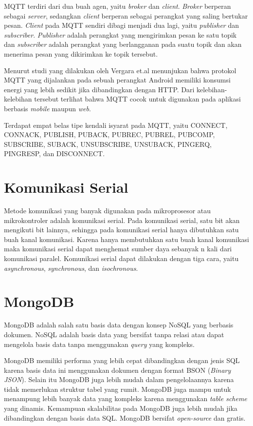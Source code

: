 MQTT terdiri dari dua buah agen, yaitu \textit{broker} dan \textit{client}. \textit{Broker} berperan sebagai \textit{server}, sedangkan \textit{client} berperan sebagai perangkat yang saling bertukar pesan. \textit{Client} pada MQTT sendiri dibagi menjadi dua lagi, yaitu \textit{publisher} dan \textit{subscriber}. \textit{Publisher} adalah perangkat yang mengirimkan pesan ke satu topik dan \textit{subscriber} adalah perangkat yang berlangganan pada suatu topik dan akan menerima pesan yang dikirimkan ke topik tersebut.

Menurut studi yang dilakukan oleh Vergara et.al menunjukan bahwa protokol MQTT yang dijalankan pada sebuah perangkat Android memiliki konsumsi energi yang lebih sedikit jika dibandingkan dengan HTTP. Dari kelebihan-kelebihan tersebut terlihat bahwa MQTT cocok untuk digunakan pada aplikasi berbasis \textit{mobile} maupun \textit{web}.

Terdapat empat belas tipe kendali isyarat pada MQTT, yaitu CONNECT, CONNACK, PUBLISH, PUBACK, PUBREC, PUBREL, PUBCOMP, SUBSCRIBE, SUBACK, UNSUBSCRIBE, UNSUBACK, PINGERQ, PINGRESP, dan DISCONNECT.


\section{Komunikasi Serial}
Metode komunikasi yang banyak digunakan pada mikroprosesor atau mikrokontroler adalah komunikasi serial. Pada komunikasi serial, satu bit akan mengikuti bit lainnya, sehingga pada komunikasi serial hanya dibutuhkan satu buah kanal komunikasi. Karena hanya membutuhkan satu buah kanal komunikasi maka komunikasi serial dapat menghemat sumber daya sebanyak n kali dari komunikasi paralel. Komunikasi serial dapat dilakukan dengan tiga cara, yaitu \textit{asynchronous}, \textit{synchronous}, dan \textit{isochronous}.
	
\section{MongoDB}
MongoDB adalah salah satu basis data dengan konsep NoSQL yang berbasis dokumen. NoSQL adalah basis data yang bersifat tanpa relasi atau dapat mengelola basis data tanpa menggunakan \textit{query} yang kompleks. 

MongoDB memiliki performa yang lebih cepat dibandingkan dengan jenis SQL karena basis data ini menggunakan dokumen dengan format BSON (\textit{Binary JSON}). Selain itu MongoDB juga lebih mudah dalam pengelolaannya karena tidak memerlukan struktur tabel yang rumit. MongoDB juga mampu untuk menampung lebih banyak data yang kompleks karena menggunakan \textit{table scheme} yang dinamis. Kemampuan skalabilitas pada MongoDB juga lebih mudah jika dibandingkan dengan basis data SQL. MongoDB bersifat \textit{open-source} dan gratis.

	
\begin{comment}

\end{comment}
